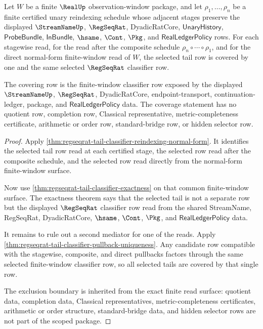\begin{theorem}
\label{thm:regseqrat-tail-classifier-normal-form-tail-coverage}
Let $W$ be a finite $\RealUp$ observation-window package, and let
$\rho_1,\ldots,\rho_n$ be a finite certified unary reindexing schedule whose
adjacent stages preserve the displayed $\StreamNameUp$, $\RegSeqRat$,
DyadicRatCore, $\mathsf{UnaryHistory}$, $\mathsf{ProbeBundle}$,
$\mathsf{InBundle}$, $\hsame$, $\Cont$, $\Pkg$, and
$\mathsf{RealLedgerPolicy}$ rows. For each stagewise read, for the read after
the composite schedule $\rho_n\circ\cdots\circ\rho_1$, and for the direct
normal-form finite-window read of $W$, the selected tail row is covered by one
and the same selected $\RegSeqRat$ classifier row.

The covering row is the finite-window classifier row exposed by the displayed
$\StreamNameUp$, $\RegSeqRat$, DyadicRatCore, endpoint-transport,
continuation-ledger, package, and $\mathsf{RealLedgerPolicy}$ data. The
coverage statement has no quotient row, completion row, Classical
representative, metric-completeness certificate, arithmetic or order row,
standard-bridge row, or hidden selector row.
\end{theorem}
\begin{proof}
Apply
\autoref{thm:regseqrat-tail-classifier-reindexing-normal-form}. It identifies
the selected tail row read at each certified stage, the selected row read after
the composite schedule, and the selected row read directly from the normal-form
finite-window surface.

Now use \autoref{thm:regseqrat-tail-classifier-exactness} on that common
finite-window surface. The exactness theorem says that the selected tail is not
a separate row but the displayed $\RegSeqRat$ classifier row read from the
shared StreamName, RegSeqRat, DyadicRatCore, $\hsame$, $\Cont$, $\Pkg$, and
$\mathsf{RealLedgerPolicy}$ data.

It remains to rule out a second mediator for one of the reads. Apply
\autoref{thm:regseqrat-tail-classifier-pullback-uniqueness}. Any candidate row
compatible with the stagewise, composite, and direct pullbacks factors through
the same selected finite-window classifier row, so all selected tails are
covered by that single row.

The exclusion boundary is inherited from the exact finite read surface: quotient
data, completion data, Classical representatives, metric-completeness
certificates, arithmetic or order structure, standard-bridge data, and hidden
selector rows are not part of the scoped package.
\end{proof}

